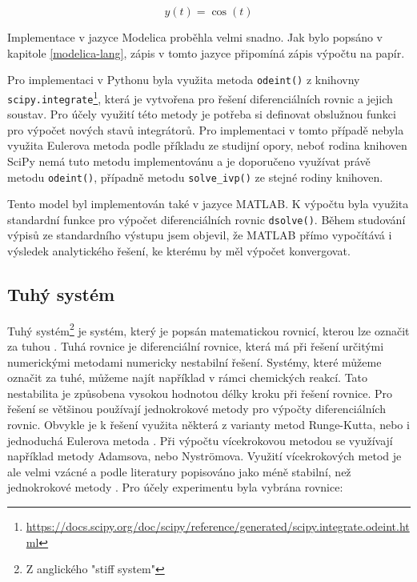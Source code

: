 \begin{equation}
    y(t) = \cos(t)
\end{equation}


Implementace v jazyce Modelica proběhla velmi snadno. Jak bylo popsáno v kapitole \ref{modelica-lang}, zápis v tomto jazyce připomíná zápis výpočtu na papír. 

Pro implementaci v Pythonu byla využita metoda \texttt{odeint()} z knihovny \texttt{scipy.integrate}\footnote{\url{https://docs.scipy.org/doc/scipy/reference/generated/scipy.integrate.odeint.html}}, která je vytvořena pro řešení diferenciálních rovnic a jejich soustav. Pro účely využití této metody je potřeba si definovat obslužnou funkci pro výpočet nových stavů integrátorů. Pro implementaci v tomto případě nebyla využita Eulerova metoda podle příkladu ze studijní opory, neboť rodina knihoven SciPy nemá tuto metodu implementovánu a je doporučeno využívat právě metodu \texttt{odeint()}, případně metodu \texttt{solve\_ivp()} ze stejné rodiny knihoven.

Tento model byl implementován také v jazyce MATLAB. K výpočtu byla využita standardní funkce pro výpočet diferenciálních rovnic \texttt{dsolve()}. Během studování výpisů ze standardního výstupu jsem objevil, že MATLAB přímo vypočítává i výsledek analytického řešení, ke kterému by měl výpočet konvergovat. 


\subsection{Tuhý systém}
Tuhý systém\footnote{Z anglického "stiff system"} je systém, který je popsán matematickou rovnicí, kterou lze označit za tuhou \cite{hairer}. Tuhá rovnice je diferenciální rovnice, která má při řešení určitými numerickými metodami numericky nestabilní řešení. Systémy, které můžeme označit za tuhé, můžeme najít například v rámci chemických reakcí. Tato nestabilita je způsobena vysokou hodnotou délky kroku při řešení rovnice. Pro řešení se většinou používají jednokrokové metody pro výpočty diferenciálních rovnic. Obvykle je k řešení využita některá z varianty metod Runge-Kutta, nebo i jednoduchá Eulerova metoda \cite{IMS-skripta}. Při výpočtu vícekrokovou metodou se využívají například metody Adamsova, nebo Nyströmova. Využití vícekrokových metod je ale velmi vzácné a podle literatury popisováno jako méně stabilní, než jednokrokové metody \cite{hairer}. Pro účely experimentu byla vybrána rovnice:

